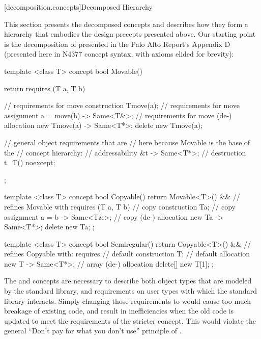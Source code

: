 [decomposition.concepts]{Decomposed Hierarchy}

\pnum
This section presents the decomposed concepts and describes how they form a hierarchy that
embodies the design precepts presented above. Our starting point is the decomposition of
 presented in the Palo Alto Report's Appendix D (presented here in N4377
concept syntax, with axioms elided for brevity):

\begin{codeblock}
template <class T>
concept bool Movable() {
  return requires (T a, T b) {
    // requirements for move construction
    T{move(a)};
    // requirements for move assignment
    { a = move(b) } -> Same<T&>;
    // requirements for move (de-) allocation
    { new T{move(a)} } -> Same<T*>;
    delete new T{move(a)};

    // general object requirements that are
    // here because Movable is the base of the
    // concept hierarchy:
    // addressability
    { &t } -> Same<T*>;
    // destruction
    { t.~T() } noexcept;
  };
}

template <class T>
concept bool Copyable() {
  return Movable<T>() && // refines Movable with
    requires (T a, T b) {
      // copy construction
      T{a};
      // copy assignment
      { a = b } -> Same<T&>;
      // copy (de-) allocation
      { new T{a} } -> Same<T*>;
      delete new T{a};
    };
}

template <class T>
concept bool Semiregular() {
  return Copyable<T>() && // refines Copyable with:
    requires {
      // default construction
      T{};
      // default allocation
      { new T{} } -> Same<T*>;
      // array (de-) allocation
      delete[] new T[1];
    };
}
\end{codeblock}
The  and  concepts are necessary to describe both object types
that are modeled by the standard library, and requirements on user types with which the standard
library interacts. Simply changing those requirements to  would cause too
much breakage of existing code, and result in inefficiencies when the old code is updated to meet
the requirements of the stricter concept. This would violate the general ``Don't pay for what you
don't use'' principle of \Cpp.

